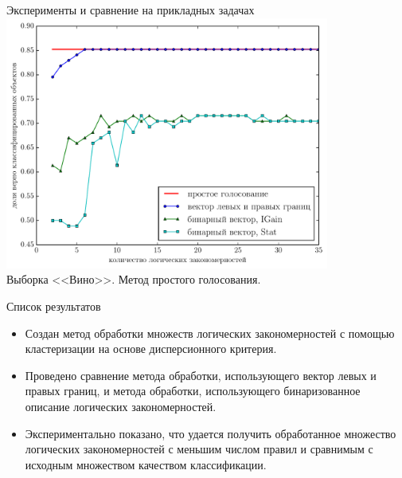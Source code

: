 \documentclass[utf8]{beamer}
\begin{document}
\begin{frame}{Эксперименты и сравнение на прикладных задачах}
  \centering
  \includegraphics[width=0.8\textwidth,keepaspectratio]{wine}
  \\ Выборка <<Вино>>. Метод простого голосования.
\end{frame}

\begin{frame}{Список результатов}
  \begin{itemize}
    \item Создан метод обработки множеств логических
      закономерностей с помощью кластеризации на основе дисперсионного
      критерия.
    \item Проведено сравнение метода обработки, использующего вектор
      левых и правых границ, и метода обработки, использующего
      бинаризованное описание логических закономерностей.
    \item Экспериментально показано, что удается получить обработанное
      множество логических закономерностей с меньшим числом правил
      и сравнимым с исходным множеством качеством классификации.
  \end{itemize}
\end{frame}
\end{document}
